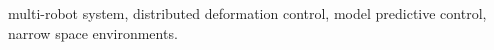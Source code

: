 \documentclass[letterpaper, 10 pt, journal, twoside]{IEEEtran}
\begin{document}
\begin{IEEEkeywords} multi-robot system, distributed deformation  control, model predictive control, narrow space environments.
\end{IEEEkeywords}

\IEEEpeerreviewmaketitle


% 







\balance

\ifCLASSOPTIONcaptionsoff
  \newpage
\fi

  

\end{document}
